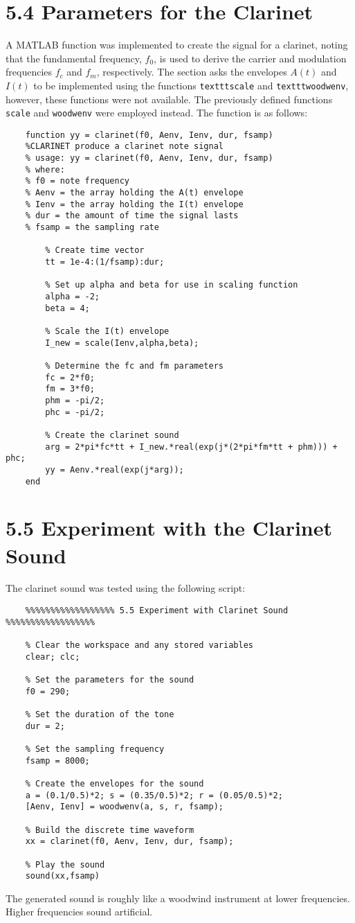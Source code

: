 \documentclass{article}
\begin{document}
\section{5.4 Parameters for the Clarinet}
A MATLAB function was implemented to create the signal for a clarinet, noting that the fundamental frequency, $f_0$, is used to derive the carrier and modulation frequencies $f_c$ and $f_m$, respectively. The section asks the envelopes $A(t)$ and $I(t)$ to be implemented using the functions \verb|textttscale| and \verb|textttwoodwenv|, however, these functions were not available. The previously defined functions \verb|scale| and \verb|woodwenv| were employed instead. The function is as follows:
\begin{lstlisting}
	function yy = clarinet(f0, Aenv, Ienv, dur, fsamp)
	%CLARINET produce a clarinet note signal
	% usage: yy = clarinet(f0, Aenv, Ienv, dur, fsamp)
	% where:
	% f0 = note frequency
	% Aenv = the array holding the A(t) envelope
	% Ienv = the array holding the I(t) envelope
	% dur = the amount of time the signal lasts
	% fsamp = the sampling rate
	    
	    % Create time vector
	    tt = 1e-4:(1/fsamp):dur;
	    
	    % Set up alpha and beta for use in scaling function
	    alpha = -2;
	    beta = 4;
	    
	    % Scale the I(t) envelope
	    I_new = scale(Ienv,alpha,beta);
	    
	    % Determine the fc and fm parameters
	    fc = 2*f0;
	    fm = 3*f0;
	    phm = -pi/2;
	    phc = -pi/2;
	    
	    % Create the clarinet sound
	    arg = 2*pi*fc*tt + I_new.*real(exp(j*(2*pi*fm*tt + phm))) + phc;
	    yy = Aenv.*real(exp(j*arg));
	end
\end{lstlisting}

\section{5.5 Experiment with the Clarinet Sound}
The clarinet sound was tested using the following script:
\begin{lstlisting}
	%%%%%%%%%%%%%%%%%% 5.5 Experiment with Clarinet Sound %%%%%%%%%%%%%%%%%%
	
	% Clear the workspace and any stored variables
	clear; clc;
	
	% Set the parameters for the sound
	f0 = 290;
	
	% Set the duration of the tone
	dur = 2;
	
	% Set the sampling frequency
	fsamp = 8000;
	
	% Create the envelopes for the sound
	a = (0.1/0.5)*2; s = (0.35/0.5)*2; r = (0.05/0.5)*2;
	[Aenv, Ienv] = woodwenv(a, s, r, fsamp);
	
	% Build the discrete time waveform
	xx = clarinet(f0, Aenv, Ienv, dur, fsamp);
	
	% Play the sound
	sound(xx,fsamp)
\end{lstlisting}

The generated sound is roughly like a woodwind instrument at lower frequencies. Higher frequencies sound artificial.
\end{document}
